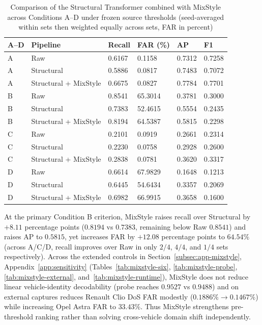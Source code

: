 \documentclass[12pt, a4paper, reqno, oneside]{book}
\begin{document}
{\renewcommand{\arraystretch}{0.85}
\begin{table}[htbp]\centering\footnotesize
\caption[Performance of Structural Transformer with MixStyle across Conditions A--D]{Comparison of the Structural Transformer combined with MixStyle across Conditions A--D under frozen source thresholds (seed-averaged within sets then weighted equally across sets, FAR in percent)}\label{tab:mixstyle-ad}
\begin{tabular}{P{1cm}P{4.3cm}P{1.6cm}P{2cm}P{1.5cm}P{1.5cm}}
\toprule
A--D & Pipeline & Recall & FAR (\%) & AP & F1\\\midrule
A & Raw & 0.6167 & 0.1158 & 0.7312 & 0.7258\\
A & Structural & 0.5886 & 0.0817 & 0.7483 & 0.7072\\
A & Structural + MixStyle & 0.6675 & 0.0827 & 0.7784 & 0.7701\\
B & Raw & 0.8541 & 65.3014 & 0.3781 & 0.3000\\
B & Structural & 0.7383 & 52.4615 & 0.5554 & 0.2435\\
B & Structural + MixStyle & 0.8194 & 64.5387 & 0.5815 & 0.2298\\
C & Raw & 0.2101 & 0.0919 & 0.2661 & 0.2314\\
C & Structural & 0.2230 & 0.0758 & 0.2928 & 0.2600\\
C & Structural + MixStyle & 0.2838 & 0.0781 & 0.3620 & 0.3317\\
D & Raw & 0.6614 & 67.9829 & 0.1648 & 0.1213\\
D & Structural & 0.6445 & 54.6434 & 0.3357 & 0.2069\\
D & Structural + MixStyle & 0.6982 & 66.9915 & 0.3658 & 0.1600\\
\bottomrule\end{tabular}
\end{table}}

At the primary Condition B criterion, MixStyle raises recall over Structural by $+8.11$ percentage points ($0.8194$ vs $0.7383$, remaining below Raw $0.8541$) and raises AP to $0.5815$, yet increases FAR by $+12.08$ percentage points to $64.54\%$ (across A/C/D, recall improves over Raw in only $2/4$, $4/4$, and $1/4$ sets respectively). Across the extended controls in Section~\ref{subsec:app-mixstyle}, Appendix~\ref{app:sensitivity} (Tables~\ref{tab:mixstyle-six}, \ref{tab:mixstyle-probe}, \ref{tab:mixstyle-external}, and~\ref{tab:mixstyle-runtime}), MixStyle does not reduce linear vehicle-identity decodability (probe reaches $0.9527$ vs $0.9488$) and on external captures reduces Renault Clio DoS FAR modestly ($0.1886\% \to 0.1467\%$) while increasing Opel Astra FAR to $33.43\%$. Thus MixStyle strengthens pre-threshold ranking rather than solving cross-vehicle domain shift independently.
\end{document}
